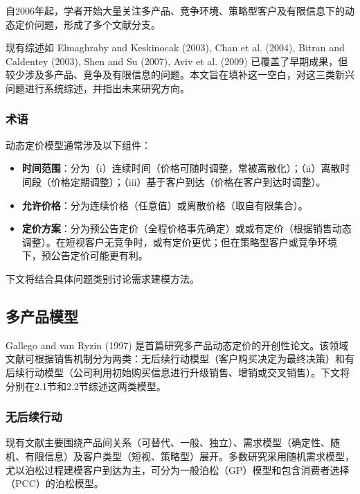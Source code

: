 自2006年起，学者开始大量关注多产品、竞争环境、策略型客户及有限信息下的动态定价问题，形成了多个文献分支。

现有综述如 Elmaghraby and Keskinocak (2003), Chan et al. (2004), Bitran and Caldentey (2003), Shen and Su (2007), Aviv et al. (2009) 已覆盖了早期成果，但较少涉及多产品、竞争及有限信息的问题。本文旨在填补这一空白，对这三类新兴问题进行系统综述，并指出未来研究方向。

\subsubsection{术语}\label{terminology}

动态定价模型通常涉及以下组件：

\begin{itemize}
	\item \textbf{时间范围}：分为（i）连续时间（价格可随时调整，常被离散化）；（ii）离散时间段（价格定期调整）；（iii）基于客户到达（价格在客户到达时调整）。
	\item \textbf{允许价格}：分为连续价格（任意值）或离散价格（取自有限集合）。
	\item \textbf{定价方案}：分为预公告定价（全程价格事先确定）或或有定价（根据销售动态调整）。在短视客户无竞争时，或有定价更优；但在策略型客户或竞争环境下，预公告定价可能更有利。
\end{itemize}

下文将结合具体问题类别讨论需求建模方法。

\subsection{多产品模型}\label{models-with-multiple-products}

Gallego and van Ryzin (1997) 是首篇研究多产品动态定价的开创性论文。该领域文献可根据销售机制分为两类：无后续行动模型（客户购买决定为最终决策）和有后续行动模型（公司利用初始购买信息进行升级销售、增销或交叉销售）。下文将分别在2.1节和2.2节综述这两类模型。

\subsubsection{无后续行动}\label{without-follow-up}

现有文献主要围绕产品间关系（可替代、一般、独立）、需求模型（确定性、随机、有限信息）及客户类型（短视、策略型）展开。多数研究采用随机需求模型，尤以泊松过程建模客户到达为主，可分为一般泊松（GP）模型和包含消费者选择（PCC）的泊松模型。

